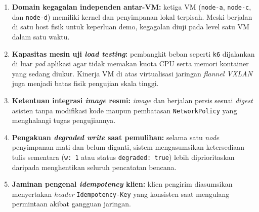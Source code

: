 \begin{enumerate}
  \item \textbf{Domain kegagalan independen antar-VM:} ketiga VM (\texttt{node-a}, \texttt{node-c}, dan \texttt{node-d}) memiliki kernel dan penyimpanan lokal terpisah. Meski berjalan di satu host fisik untuk keperluan demo, kegagalan diuji pada level satu VM dalam satu waktu.
  \item \textbf{Kapasitas mesin uji \textit{load testing}:} pembangkit beban seperti \texttt{k6} dijalankan di luar \textit{pod} aplikasi agar tidak memakan kuota CPU serta memori kontainer yang sedang diukur. Kinerja VM di atas virtualisasi jaringan \textit{flannel VXLAN} juga menjadi batas fisik pengujian skala tinggi.
  \item \textbf{Ketentuan integrasi \textit{image} resmi:} \textit{image}  dan  berjalan persis sesuai \textit{digest} asisten tanpa modifikasi kode maupun pembatasan \texttt{NetworkPolicy} yang menghalangi tugas pengujiannya.
  \item \textbf{Pengakuan \textit{degraded write} saat pemulihan:} selama satu \textit{node} penyimpanan mati dan belum diganti, sistem mengasumsikan ketersediaan tulis sementara (\texttt{w: 1} atau status \texttt{degraded: true}) lebih diprioritaskan daripada menghentikan seluruh pencatatan bencana.
  \item \textbf{Jaminan pengenal \textit{idempotency} klien:} klien pengirim  diasumsikan menyertakan \textit{header} \texttt{Idempotency-Key} yang konsisten saat mengulang permintaan akibat gangguan jaringan.
\end{enumerate}
